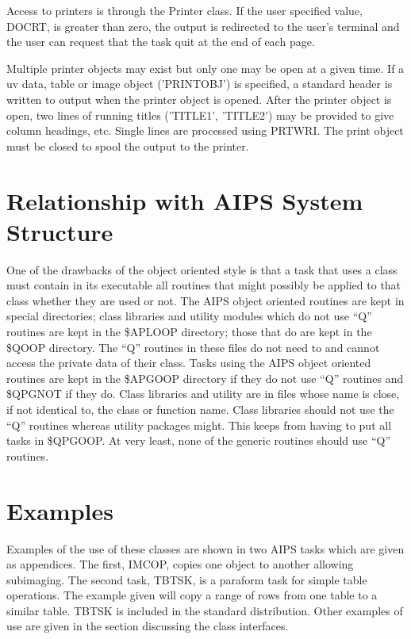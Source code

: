    Access to printers is through the Printer class.  If the user
specified value, DOCRT, is greater than zero, the output is redirected
to the user's terminal and the user can request that the task quit at
the end of each page.

   Multiple printer objects may exist but only one may be open at a
given time.  If a uv data, table or image object
('PRINTOBJ') is specified, a
standard header is written to output when the printer object is
opened.  After the printer object is open, two lines of running titles
('TITLE1', 'TITLE2') may be provided to give column headings, etc.
Single lines are processed using PRTWRI.  The print object must be
closed to spool the output to the printer.

\section{Relationship with AIPS System Structure}

   One of the drawbacks of the object oriented style is that a task
that uses a class must contain in its executable all routines that
might possibly be applied to that class whether they are used or not.
The AIPS  object oriented routines are kept in special directories;
class libraries and utility modules which do not use ``Q'' routines
are kept in the \$APLOOP directory; those that do are kept in the
\$QOOP directory.  The ``Q'' routines in these files
do not need to and cannot access the private data of their class.
Tasks using the AIPS object oriented routines are kept in the \$APGOOP
directory if they do not use ``Q'' routines and \$QPGNOT if they do.
Class libraries and utility are in files whose name is close, if not
identical to, the class or function name.
   Class libraries should not use the ``Q'' routines whereas utility
packages might.  This keeps from having to put all tasks in \$QPGOOP.
At very least, none of the generic routines should use ``Q'' routines.

\section{Examples}

   Examples of the use of these classes are shown in  two AIPS tasks
which are given as appendices.
The first, IMCOP, copies one object to another allowing subimaging.
The second task, TBTSK, is a paraform task for simple table
operations.  The example given will copy a range of rows from one
table to a similar table.
TBTSK is included in the standard distribution.  Other examples of use
are given in the section discussing the class interfaces.


